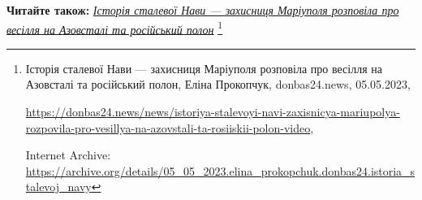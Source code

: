  
 
 
 
 

\textbf{Читайте також:} \href{https://archive.org/details/05_05_2023.elina_prokopchuk.donbas24.istoria_stalevoj_navy}{\emph{Історія сталевої Нави — захисниця Маріуполя розповіла про весілля на Азовсталі та російський полон}}%
\footnote{Історія сталевої Нави — захисниця Маріуполя розповіла про весілля на Азовсталі та російський полон, Еліна Прокопчук, donbas24.news, 05.05.2023, \par%
\url{https://donbas24.news/news/istoriya-stalevoyi-navi-zaxisnicya-mariupolya-rozpovila-pro-vesillya-na-azovstali-ta-rosiiskii-polon-video}, \par%
Internet Archive: \url{https://archive.org/details/05_05_2023.elina_prokopchuk.donbas24.istoria_stalevoj_navy}%
}
